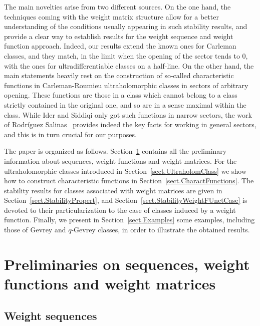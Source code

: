 \documentclass[11pt,a4paper]{article}
\theoremstyle{plain}
\theoremstyle{definition}
\begin{document}
The main novelties arise from two different sources. On the one hand, the techniques coming with the weight matrix structure allow for a better understanding of the conditions usually appearing in such stability results, and provide a clear way to establish results for the weight sequence and weight function approach. Indeed, our results extend the known ones for Carleman classes, and they match, in the limit when the opening of the sector tends to 0, with the ones for ultradifferentiable classes on a half-line. On the other hand, the main statements heavily rest on the construction of so-called characteristic functions in Carleman-Roumieu ultraholomorphic classes in sectors of arbitrary opening. These functions are those in a class which cannot belong to a class strictly contained in the original one, and so are in a sense maximal within the class. While Ider and Siddiqi only got such functions in narrow sectors, the work of Rodríguez Salinas~\cite{salinas62} provides indeed the key facts for working in general sectors, and this is in turn crucial for our purposes.

The paper is organized as follows. Section~\ref{sect.WeightCondit} contains all the preliminary information about sequences, weight functions and weight matrices. For the ultraholomorphic classes introduced in Section~\ref{sect.UltraholomClass} we show how to construct characteristic functions in Section~\ref{sect.CharactFunctions}. The stability results for classes associated with weight matrices are given in Section~\ref{sect.StabilityPropert}, and Section~\ref{sect.StabilityWeightFUnctCase} is devoted to their particularization to the case of classes induced by a weight function.
{Finally, we present in Section~\ref{sect.Examples} some examples, including those of Gevrey and $q$-Gevrey classes, in order to illustrate the obtained results.}

\section{Preliminaries on sequences, weight functions and weight matrices}\label{sect.WeightCondit}

\subsection{Weight sequences}\label{ssectweightsequences}
\end{document}
